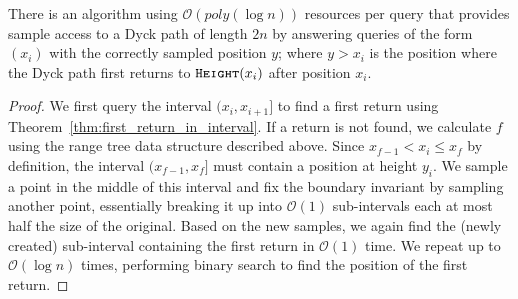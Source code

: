 \begin{theorem}
\label{thm:dyck_first_return_sampling}
There is an algorithm using $\mathcal O(poly(\log n))$ resources per query that provides sample access to a Dyck path of length $2n$
by answering queries of the form $(x_i)$ with the correctly sampled position $y$;
where $y>x_i$ is the position where the Dyck path first returns to $\texttt{\textsc{Height}}(x_i)$ after position $x_i$.
\end{theorem}
\begin{proof}
We first query the interval $(x_i,x_{i+1}]$ to find a first return using Theorem~\ref{thm:first_return_in_interval}.
If a return is not found, we calculate $f$ using the range tree data structure described above.
Since $x_{f-1}<x_i\le x_f$ by definition, the interval $(x_{f-1},x_f]$ must contain a position at height $y_i$.
We sample a point in the middle of this interval and fix the boundary invariant by sampling another point,
essentially breaking it up into $\mathcal O(1)$ sub-intervals each at most half the size of the original.
Based on the new samples, we again find the (newly created) sub-interval containing the first return in $\mathcal O(1)$ time.
We repeat up to $\mathcal O(\log n)$ times, performing binary search to find the position of the first return.
\end{proof}
